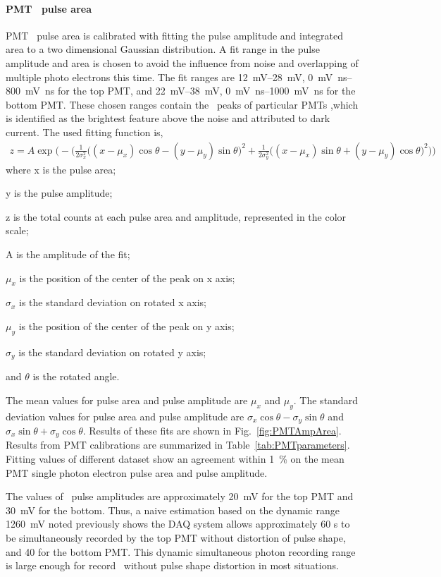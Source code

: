 \paragraph{PMT \sphe\ pulse area}
 PMT \sphe\ pulse area is calibrated with fitting the pulse amplitude and integrated area to a two dimensional Gaussian distribution. A fit range in the pulse amplitude and area is chosen to avoid the influence from noise and overlapping of multiple photo electrons this time. The fit ranges are \SIrange{12}{28}{\mV}, \SIrange{0}{800}{\mV\ns} for the top PMT, and \SIrange{22}{38}{\mV}, \SIrange{0}{1000}{\mV\ns} for the bottom PMT. These chosen ranges contain the \sphe\ peaks of particular PMTs ,which is identified as the brightest feature above the noise and attributed to dark current. The used fitting function is, 
 \begin{align}
 z = 	A \exp \bigg( -\Big(\frac{1}{2 \sigma_x^2} \big( (x-\mu_{x})\cos \theta - (y-\mu_y)\sin \theta \big) ^2 + \frac{1}{2 \sigma_y^2} \big( (x-\mu_{x})\sin \theta + (y-\mu_y)\cos \theta \big) ^2  \Big) \bigg)
 \end{align} 
where x is the pulse area; 

y is the pulse amplitude; 

z is the total counts at each pulse area and amplitude, represented in the color scale; 

A is the amplitude of the fit; 

$\mu_{x}$ is the position of the center of the peak on x axis; 

$\sigma_{x}$ is the standard deviation on rotated x axis; 

$\mu_{y}$ is the position of the center of the peak on y axis; 

$\sigma_{y}$ is the standard deviation on rotated y axis; 

and $\theta$ is the rotated angle.  

The mean values for pulse area and pulse amplitude are $\mu_{x}$ and $\mu_{y}$. The standard deviation values for pulse area and pulse amplitude are $\sigma_{x} \cos \theta - \sigma_{y} \sin \theta$ and $\sigma_{x} \sin \theta + \sigma_{y} \cos \theta$. Results of these fits are shown in Fig.~\ref{fig:PMTAmpArea}. Results from PMT calibrations are summarized in Table~\ref{tab:PMTparameters}. Fitting values of different dataset show an agreement within \SI{1}{\percent} on the mean PMT single photon electron pulse area and pulse amplitude. 

The values of \sphe\ pulse amplitudes are approximately \SI{20}{\mV} for the top PMT and \SI{30}{\mV} for the bottom. Thus, a naive estimation based on the dynamic range \SI{1260}{\mV} noted previously shows the DAQ system allows approximately 60 \sphe s to be simultaneously recorded by the top PMT without distortion of pulse shape, and 40 for the bottom PMT. This dynamic simultaneous photon recording range is large enough for record \ees\ without pulse shape distortion in most situations. 

